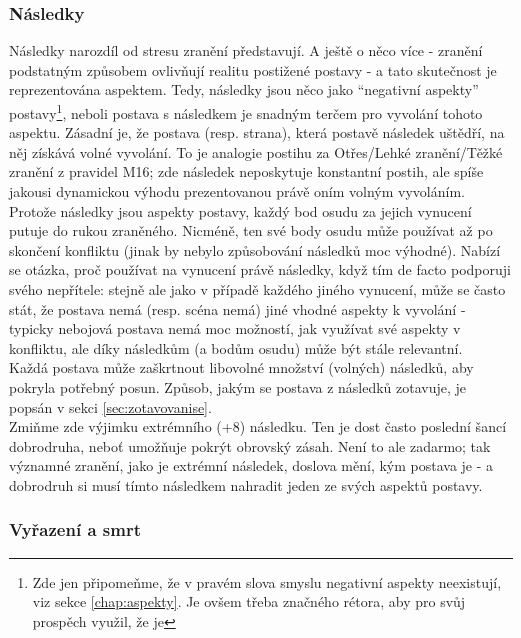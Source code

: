 \subsubsection{Následky}
\label{sec:následky}

Následky narozdíl od stresu zranění představují. A ještě o něco více - zranění podstatným způsobem ovlivňují realitu postižené postavy - a tato skutečnost je reprezentována aspektem. Tedy, následky jsou něco jako ``negativní aspekty'' postavy\footnote{Zde jen připomeňme, že v pravém slova smyslu negativní aspekty neexistují, viz sekce \ref{chap:aspekty}. Je ovšem třeba značného rétora, aby pro svůj prospěch využil, že je }, neboli postava s následkem je snadným terčem pro vyvolání tohoto aspektu. Zásadní je, že postava (resp. strana), která postavě následek uštědří, na něj získává volné vyvolání. To je analogie postihu za Otřes/Lehké zranění/Těžké zranění z pravidel M16; zde následek neposkytuje konstantní postih, ale spíše jakousi dynamickou výhodu prezentovanou právě oním volným vyvoláním.\\
Protože následky jsou aspekty postavy, každý bod osudu za jejich vynucení putuje do rukou zraněného. Nicméně, ten své body osudu může používat až po skončení konfliktu (jinak by nebylo způsobování následků moc výhodné). Nabízí se otázka, proč používat na vynucení právě následky, když tím de facto podporuji svého nepřítele: stejně ale jako v případě každého jiného vynucení, může se často stát, že postava nemá (resp. scéna nemá) jiné vhodné aspekty k vyvolání - typicky nebojová postava nemá moc možností, jak využívat své aspekty v konfliktu, ale díky následkům (a bodům osudu) může být stále relevantní.\\
Každá postava může zaškrtnout libovolné množství (volných) následků, aby pokryla potřebný posun. Způsob, jakým se postava z následků zotavuje, je popsán v sekci \ref{sec:zotavovanise}.\\
Zmiňme zde výjimku extrémního (+8) následku. Ten je dost často poslední šancí dobrodruha, neboť umožňuje pokrýt obrovský zásah. Není to ale zadarmo; tak významné zranění, jako je extrémní následek, doslova mění, kým postava je - a dobrodruh si musí tímto následkem nahradit jeden ze svých aspektů postavy.


\subsubsection{Vyřazení a smrt}
\label{sec:vyrazeniasmrt}

